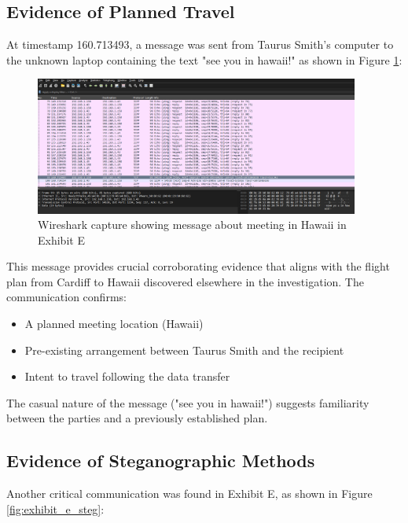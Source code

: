 \subsection{Evidence of Planned Travel}
At timestamp 160.713493, a message was sent from Taurus Smith's computer to the unknown laptop containing the text "see you in hawaii!" as shown in Figure \ref{fig:exhibit_e_hawaii}:

\begin{figure}[h]
    \centering
    \includegraphics[width=0.95\textwidth]{images/Network_Analysis/ExhibitE_pcap_hawaii.png}
    \caption{Wireshark capture showing message about meeting in Hawaii in Exhibit E}
    \label{fig:exhibit_e_hawaii}
\end{figure}

This message provides crucial corroborating evidence that aligns with the flight plan from Cardiff to Hawaii discovered elsewhere in the investigation. The communication confirms:

\begin{itemize}
    \item A planned meeting location (Hawaii)
    \item Pre-existing arrangement between Taurus Smith and the recipient
    \item Intent to travel following the data transfer
\end{itemize}

The casual nature of the message ("see you in hawaii!") suggests familiarity between the parties and a previously established plan.

\subsection{Evidence of Steganographic Methods}
Another critical communication was found in Exhibit E, as shown in Figure \ref{fig:exhibit_e_steg}:


